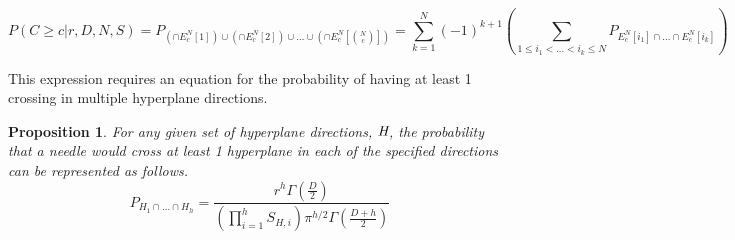 \documentclass{article}
\newtheorem{proposition}{Proposition}
\begin{document}
\begin{equation}
	P(C\ge c|r, D, N, S) = P_{(\cap E_c^N[1])\cup(\cap E_c^N[2])\cup\hdots\cup(\cap E_c^N[{N \choose c}])} = \sum_{k=1}^N (-1)^{k+1}\left(\sum_{1\le i_1 < \hdots < i_k \le N}P_{E_c^N[i_1] \cap \hdots \cap E_c^N[i_k]} \right)
\end{equation}

This expression requires an equation for the probability of having at least 1 crossing in
multiple hyperplane directions. 

\begin{proposition}
	For any given set of hyperplane directions, $\emph{H}$, the probability that a needle would cross
	at least 1 hyperplane in each of the specified directions can be represented as follows.
	\begin{equation}
		P_{H_1 \cap \hdots \cap H_h} = \frac{r^h \Gamma(\frac{D}{2})}{(\prod_{i=1}^h S_{H,i}) \pi^{h/2} \Gamma(\frac{D+h}{2})}
	\end{equation}
\end{proposition}
\end{document}
